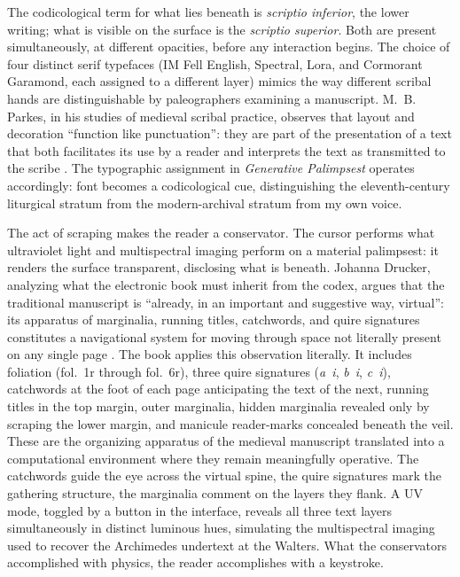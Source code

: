 \documentclass[12pt]{article}
\begin{document}
The codicological term for what lies beneath is \textit{scriptio inferior}, the
lower writing; what is visible on the surface is the \textit{scriptio superior}.
Both are present simultaneously, at different opacities, before any interaction
begins. The choice of four distinct serif typefaces (IM Fell English, Spectral,
Lora, and Cormorant Garamond, each assigned to a different layer) mimics the
way different scribal hands are distinguishable by paleographers examining a
manuscript. M.~B. Parkes, in his studies of medieval scribal practice, observes
that layout and decoration ``function like punctuation'': they are part of the
presentation of a text that both facilitates its use by a reader and interprets
the text as transmitted to the scribe
\parencite{parkes1991}. The typographic assignment in \textit{Generative Palimpsest} operates accordingly:
font becomes a codicological cue, distinguishing the eleventh-century liturgical
stratum from the modern-archival stratum from my own voice.

The act of scraping makes the reader a conservator. The cursor performs what
ultraviolet light and multispectral imaging perform on a material palimpsest: it
renders the surface transparent, disclosing what is beneath. Johanna Drucker,
analyzing what the electronic book must inherit from the codex, argues that the
traditional manuscript is ``already, in an important and suggestive way,
virtual'': its apparatus of marginalia, running titles, catchwords, and quire
signatures constitutes a navigational system for moving through space not
literally present on any single page \parencite{drucker2008}. The book applies
this observation
literally. It includes foliation (fol.~1r through fol.~6r), three quire
signatures (\textit{a~i}, \textit{b~i}, \textit{c~i}), catchwords at the foot
of each page anticipating the text of the next, running titles in the top
margin, outer marginalia, hidden marginalia revealed only by scraping the lower
margin, and manicule reader-marks concealed beneath the veil. These are the organizing apparatus of the medieval manuscript
translated into a computational environment where they remain meaningfully
operative. The catchwords guide the eye across the virtual spine, the quire
signatures mark the gathering structure, the marginalia comment on the layers
they flank. A UV mode, toggled by a button in the interface, reveals all three
text layers simultaneously in distinct luminous hues, simulating the
multispectral imaging used to recover the Archimedes undertext at the Walters.
What the conservators accomplished with physics, the reader accomplishes with a
keystroke.
\end{document}
